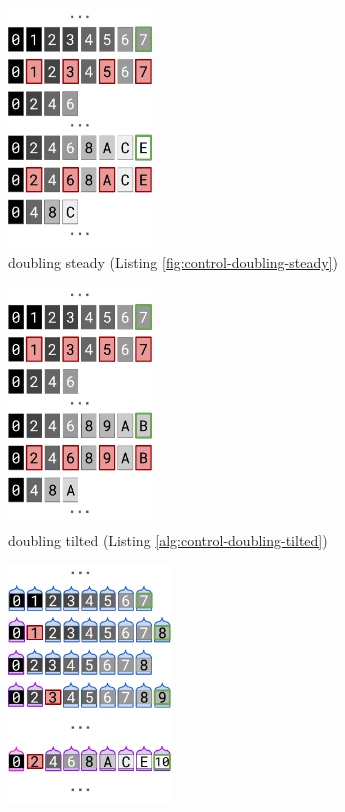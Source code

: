 \begin{figure}
\begin{subfigure}{0.25\linewidth}
\centering
\includegraphics[height=2.5in]{img/surface-control-naive-steady}
\caption{doubling steady (Listing \ref{fig:control-doubling-steady})}
\label{fig:surface-control:naive-steady}
\end{subfigure}%
\begin{subfigure}{0.25\linewidth}
\centering
\includegraphics[height=2.5in]{img/surface-control-naive-tilted}
\caption{doubling tilted (Listing \ref{alg:control-doubling-tilted})}
\label{fig:surface-control:naive-tilted}
\end{subfigure}%
\begin{subfigure}{0.25\linewidth}
\centering
\includegraphics[height=2.5in]{img/surface-control-zhao-steady}

\end{subfigure}
\end{figure}
